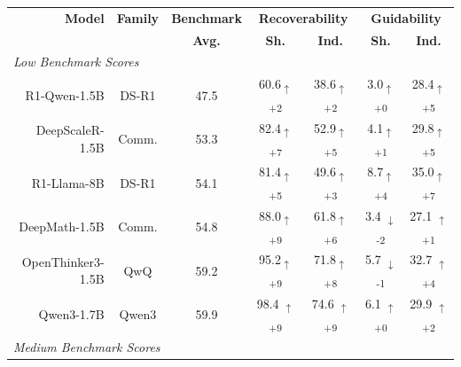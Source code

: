 \documentclass{article} %
\begin{document}
\begin{table}[t]
  \centering
  \small
    \begin{tabular}{r|c|c|cc|cc}
    \toprule
    \textbf{Model} &
    \textbf{Family} &
    \multicolumn{1}{c|}{\textbf{Benchmark}} & 
    \multicolumn{2}{c|}{\textbf{Recoverability}} &
    \multicolumn{2}{c}{\textbf{Guidability}} \\
    &  & \multicolumn{1}{c|}{\textbf{Avg.}} &
    \textbf{Sh.} & \textbf{Ind.} & \textbf{Sh.} & \textbf{Ind.} \\
    \midrule
    \multicolumn{7}{l}{\textit{Low Benchmark Scores}} \\
    \midrule
    
    R1-Qwen-1.5B    & DS-R1 &  47.5 & \cellcolor{green!12}60.6\textsubscript{$\uparrow$+2} & \cellcolor{green!12}38.6\textsubscript{$\uparrow$+2} & 
    \cellcolor{green!0}3.0\textsubscript{$\uparrow$+0} & 
    \cellcolor{green!15}28.4\textsubscript{$\uparrow$+5} \\
    
    DeepScaleR-1.5B         & Comm. & 53.3 & \cellcolor{green!27}82.4\textsubscript{$\uparrow$+7} & \cellcolor{green!15}52.9\textsubscript{$\uparrow$+5} & 
    \cellcolor{green!11}4.1\textsubscript{$\uparrow$+1} & 
    \cellcolor{green!15}29.8\textsubscript{$\uparrow$+5} \\
    
    R1-Llama-8B     & DS-R1 & 54.1 & 
    \cellcolor{green!15}81.4\textsubscript{$\uparrow$+5} & \cellcolor{green!13}49.6\textsubscript{$\uparrow$+3} & 
    \cellcolor{green!14}8.7\textsubscript{$\uparrow$+4} &
    \cellcolor{green!27}35.0\textsubscript{$\uparrow$+7} \\
    
    DeepMath-1.5B           & Comm. & 54.8 & \cellcolor{green!29}88.0\textsubscript{$\uparrow$+9} & \cellcolor{green!16}61.8\textsubscript{$\uparrow$+6} & 
    \cellcolor{red!12} 3.4 \textsubscript{$\downarrow$-2} & 
    \cellcolor{green!11} 27.1 \textsubscript{$\uparrow$+1} \\
    
    OpenThinker3-1.5B       & QwQ & 59.2 & \cellcolor{green!29}95.2\textsubscript{$\uparrow$+9} & \cellcolor{green!28}71.8\textsubscript{$\uparrow$+8} & 
    \cellcolor{red!11} 5.7 \textsubscript{$\downarrow$-1}& 
    \cellcolor{green!14} 32.7 \textsubscript{$\uparrow$+4} \\
    
    Qwen3-1.7B              & Qwen3 & 59.9 &
    \cellcolor{green!29}98.4 \textsubscript{$\uparrow$+9} & 
    \cellcolor{green!29}74.6 \textsubscript{$\uparrow$+9} & 
    \cellcolor{green!0} 6.1  \textsubscript{$\uparrow$+0}& 
    \cellcolor{green!12} 29.9 \textsubscript{$\uparrow$+2}\\
    \midrule
    \multicolumn{7}{l}{\textit{Medium Benchmark Scores}} \\
    \midrule
    

\end{tabular}
\end{table}
\end{document}

